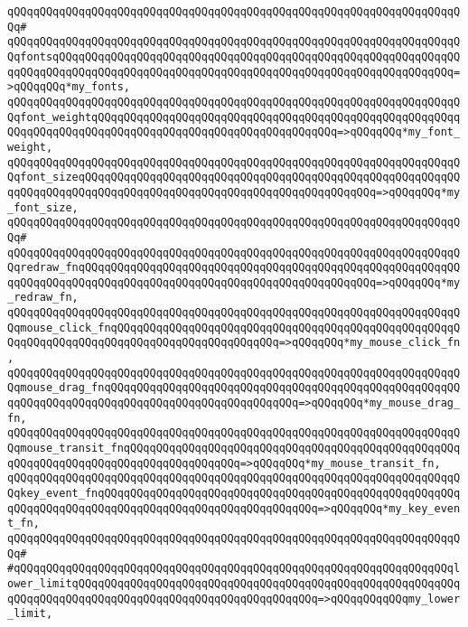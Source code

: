 \verb|qQQqqQQqqQQqqQQqqQQqqQQqqQQqqQQqqQQqqQQqqQQqqQQqqQQqqQQqqQQqqQQqqQQqqQQq#|\newline
\verb|qQQqqQQqqQQqqQQqqQQqqQQqqQQqqQQqqQQqqQQqqQQqqQQqqQQqqQQqqQQqqQQqqQQqqQQqfontsqQQqqQQqqQQqqQQqqQQqqQQqqQQqqQQqqQQqqQQqqQQqqQQqqQQqqQQqqQQqqQQqqQQqqQQqqQQqqQQqqQQqqQQqqQQqqQQqqQQqqQQqqQQqqQQqqQQqqQQqqQQqqQQqqQQq=>qQQqqQQq*my_fonts,|\newline
\verb|qQQqqQQqqQQqqQQqqQQqqQQqqQQqqQQqqQQqqQQqqQQqqQQqqQQqqQQqqQQqqQQqqQQqqQQqfont_weightqQQqqQQqqQQqqQQqqQQqqQQqqQQqqQQqqQQqqQQqqQQqqQQqqQQqqQQqqQQqqQQqqQQqqQQqqQQqqQQqqQQqqQQqqQQqqQQqqQQqqQQqqQQq=>qQQqqQQq*my_font_weight,|\newline
\verb|qQQqqQQqqQQqqQQqqQQqqQQqqQQqqQQqqQQqqQQqqQQqqQQqqQQqqQQqqQQqqQQqqQQqqQQqfont_sizeqQQqqQQqqQQqqQQqqQQqqQQqqQQqqQQqqQQqqQQqqQQqqQQqqQQqqQQqqQQqqQQqqQQqqQQqqQQqqQQqqQQqqQQqqQQqqQQqqQQqqQQqqQQqqQQqqQQq=>qQQqqQQq*my_font_size,|\newline
\verb|qQQqqQQqqQQqqQQqqQQqqQQqqQQqqQQqqQQqqQQqqQQqqQQqqQQqqQQqqQQqqQQqqQQqqQQq#|\newline
\verb|qQQqqQQqqQQqqQQqqQQqqQQqqQQqqQQqqQQqqQQqqQQqqQQqqQQqqQQqqQQqqQQqqQQqqQQqredraw_fnqQQqqQQqqQQqqQQqqQQqqQQqqQQqqQQqqQQqqQQqqQQqqQQqqQQqqQQqqQQqqQQqqQQqqQQqqQQqqQQqqQQqqQQqqQQqqQQqqQQqqQQqqQQqqQQqqQQq=>qQQqqQQq*my_redraw_fn,|\newline
\verb|qQQqqQQqqQQqqQQqqQQqqQQqqQQqqQQqqQQqqQQqqQQqqQQqqQQqqQQqqQQqqQQqqQQqqQQqmouse_click_fnqQQqqQQqqQQqqQQqqQQqqQQqqQQqqQQqqQQqqQQqqQQqqQQqqQQqqQQqqQQqqQQqqQQqqQQqqQQqqQQqqQQqqQQqqQQqqQQq=>qQQqqQQq*my_mouse_click_fn,|\newline
\verb|qQQqqQQqqQQqqQQqqQQqqQQqqQQqqQQqqQQqqQQqqQQqqQQqqQQqqQQqqQQqqQQqqQQqqQQqmouse_drag_fnqQQqqQQqqQQqqQQqqQQqqQQqqQQqqQQqqQQqqQQqqQQqqQQqqQQqqQQqqQQqqQQqqQQqqQQqqQQqqQQqqQQqqQQqqQQqqQQqqQQq=>qQQqqQQq*my_mouse_drag_fn,|\newline
\verb|qQQqqQQqqQQqqQQqqQQqqQQqqQQqqQQqqQQqqQQqqQQqqQQqqQQqqQQqqQQqqQQqqQQqqQQqmouse_transit_fnqQQqqQQqqQQqqQQqqQQqqQQqqQQqqQQqqQQqqQQqqQQqqQQqqQQqqQQqqQQqqQQqqQQqqQQqqQQqqQQqqQQqqQQq=>qQQqqQQq*my_mouse_transit_fn,|\newline
\verb|qQQqqQQqqQQqqQQqqQQqqQQqqQQqqQQqqQQqqQQqqQQqqQQqqQQqqQQqqQQqqQQqqQQqqQQqkey_event_fnqQQqqQQqqQQqqQQqqQQqqQQqqQQqqQQqqQQqqQQqqQQqqQQqqQQqqQQqqQQqqQQqqQQqqQQqqQQqqQQqqQQqqQQqqQQqqQQqqQQqqQQq=>qQQqqQQq*my_key_event_fn,|\newline
\verb|qQQqqQQqqQQqqQQqqQQqqQQqqQQqqQQqqQQqqQQqqQQqqQQqqQQqqQQqqQQqqQQqqQQqqQQq#|\newline
\verb|#qQQqqQQqqQQqqQQqqQQqqQQqqQQqqQQqqQQqqQQqqQQqqQQqqQQqqQQqqQQqqQQqqQQqlower_limitqQQqqQQqqQQqqQQqqQQqqQQqqQQqqQQqqQQqqQQqqQQqqQQqqQQqqQQqqQQqqQQqqQQqqQQqqQQqqQQqqQQqqQQqqQQqqQQqqQQqqQQqqQQq=>qQQqqQQqqQQqmy_lower_limit,|\newline
